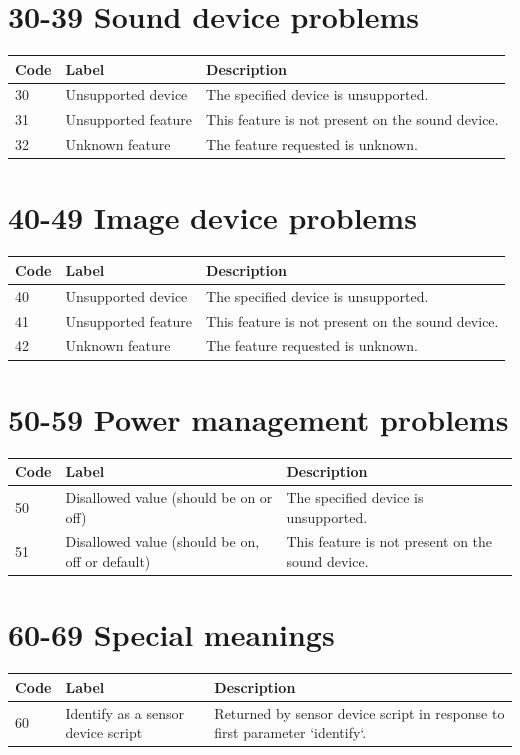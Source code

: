 \documentclass[
]{book}
\begin{document}
\section{30-39 Sound device problems}\label{sound-device-problems}

\begin{tabular}{l|l|l}
\hline
Code & Label & Description\\
\hline
30 & Unsupported device & The specified device is unsupported.\\
\hline
31 & Unsupported feature & This feature is not present on the sound device.\\
\hline
32 & Unknown feature & The feature requested is unknown.\\
\hline
\end{tabular}

\section{40-49 Image device problems}\label{image-device-problems}

\begin{tabular}{l|l|l}
\hline
Code & Label & Description\\
\hline
40 & Unsupported device & The specified device is unsupported.\\
\hline
41 & Unsupported feature & This feature is not present on the sound device.\\
\hline
42 & Unknown feature & The feature requested is unknown.\\
\hline
\end{tabular}

\section{50-59 Power management problems}\label{power-management-problems}

\begin{tabular}{l|l|l}
\hline
Code & Label & Description\\
\hline
50 & Disallowed value (should be on or off) & The specified device is unsupported.\\
\hline
51 & Disallowed value (should be on, off or default) & This feature is not present on the sound device.\\
\hline
\end{tabular}

\section{60-69 Special meanings}\label{special-meanings}

\begin{tabular}{l|l|l}
\hline
Code & Label & Description\\
\hline
60 & Identify as a sensor device script & Returned by sensor device script in response to first parameter `identify`.\\
\hline
\end{tabular}

  
\end{document}
